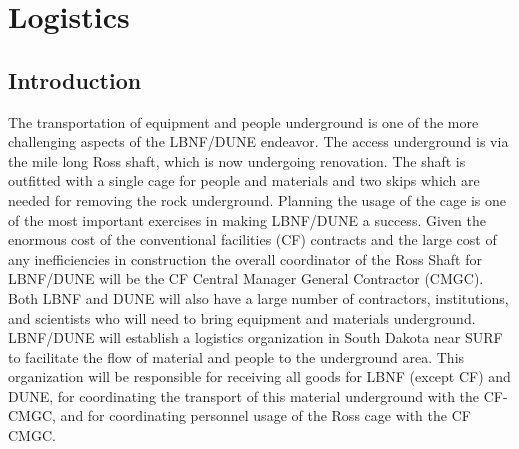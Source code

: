 \section{Logistics}
\label{sec:fdsp-tc-log}

\subsection{Introduction}
\label{sec:fdsp-tc-log-intro}
The transportation of equipment and people underground is one of the more challenging aspects of the LBNF/DUNE endeavor. The access underground is via the mile long Ross shaft, which is now undergoing renovation. The shaft is outfitted with a single cage for people and materials and two skips which are needed for removing the rock underground. Planning the usage of the cage is one of the most important exercises in making LBNF/DUNE a success. Given the enormous cost of the conventional facilities (CF) contracts and the large cost of any inefficiencies in construction the overall coordinator of the Ross Shaft for LBNF/DUNE will be the CF Central Manager General Contractor (CMGC). Both LBNF and DUNE will also have a large number of contractors, institutions, and scientists who will need to bring equipment and materials underground. LBNF/DUNE will establish a logistics organization in South Dakota near SURF to facilitate the flow of material and people to the underground area. This organization will be responsible for receiving all goods for LBNF (except CF) and DUNE,
for coordinating the transport of this material underground with the CF-CMGC, and
for coordinating personnel usage of the Ross cage with the CF CMGC. 


 
